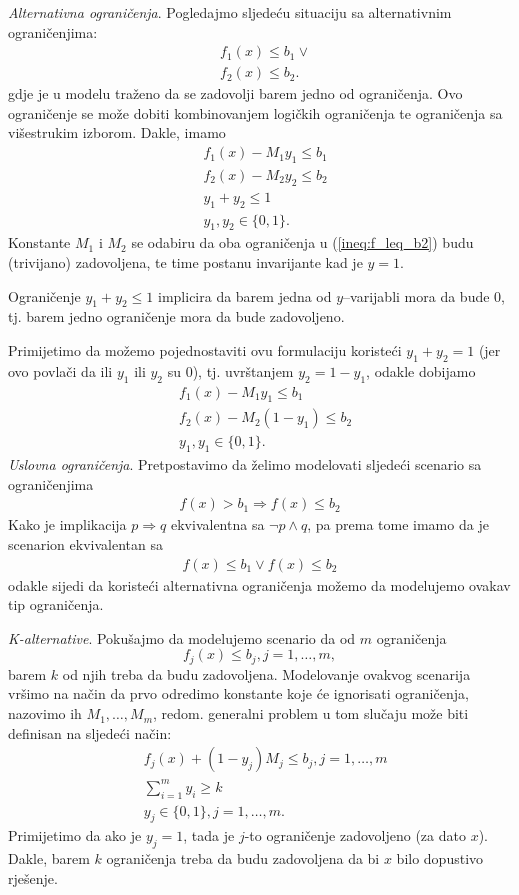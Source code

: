 \documentclass[a4paper, utf8, 11pt, colorlinks]{article}
\begin{document}
\emph{Alternativna ograničenja}. Pogledajmo sljedeću situaciju sa alternativnim ograničenjima:
\begin{align}
     &f_1(x) \leq b_1 \vee \nonumber\\
     &f_2(x) \leq b_2.\label{ineq:f_leq_b2}
\end{align}
gdje je u modelu traženo da se zadovolji barem jedno od ograničenja. 
Ovo ograničenje se može dobiti kombinovanjem logičkih ograničenja te ograničenja sa višestrukim izborom. Dakle, imamo 
\begin{align*}
      &f_1(x) - M_1 y_1  \leq b_1 \\
      &f_2(x) - M_2 y_2  \leq b_2 \\
      & y_1 + y_2 \leq 1 \\
      & y_1, y_2 \in \{0, 1\}.
\end{align*}
Konstante $M_1$ i $M_2$ se odabiru da oba ograničenja u (\ref{ineq:f_leq_b2})  budu (trivijano) zadovoljena, te time postanu invarijante kad je $y=1$.

Ograničenje $y_1 + y_2 \leq 1$ implicira da barem jedna od $y$--varijabli mora da bude 0, tj. barem jedno ograničenje mora da bude zadovoljeno. 

Primijetimo da možemo  pojednostaviti ovu formulaciju koristeći $y_1 + y_2 = 1$ (jer ovo povlači da ili $y_1$ ili $y_2$ su 0), tj. uvrštanjem $y_2 =  1-y_1$, odakle dobijamo 
\begin{align*}
      & f_1(x) - M_1 y_1       \leq b_1 \\
      & f_2(x) - M_2 (1-y_1)   \leq b_2  \\
      & y_1, y_1 \in \{0,1 \}.
\end{align*}
\emph{Uslovna ograničenja}. 
Pretpostavimo da želimo modelovati sljedeći scenario sa ograničenjima 
\begin{align*}
    f(x) > b_1 \Rightarrow f(x) \leq b_2 
\end{align*}
Kako je implikacija $p \Rightarrow q$ ekvivalentna sa $\neg p \wedge q$, pa prema tome imamo da je scenarion ekvivalentan sa
\begin{align*}
    f(x) \leq b_1 \vee f(x) \leq b_2 
\end{align*}
odakle sijedi da koristeći alternativna ograničenja možemo da modelujemo ovakav tip ograničenja.

\emph{K-alternative}. Pokušajmo da modelujemo scenario da od $m$ ograničenja
$$f_j(x) \leq  b_j, j=1,\ldots,m,$$
barem $k$ od njih treba da budu zadovoljena. Modelovanje ovakvog scenarija vršimo na način da prvo odredimo konstante koje će ignorisati ograničenja, nazovimo ih $M_1, \ldots, M_m$, redom. generalni problem u tom slučaju može biti definisan na sljedeći način:
\begin{align}
     &f_j(x) + (1-y_j) M_j \leq b_j, j=1,\ldots,m\\
     & \sum_{i=1}^m y_i \geq k \\
     & y_j \in \{0,1\}, j=1,\ldots,m.
\end{align}
Primijetimo da ako je $y_j = 1$, tada je $j$-to ograničenje zadovoljeno (za dato $x$). Dakle, barem $k$ ograničenja treba da budu zadovoljena da bi $x$ bilo dopustivo rješenje. 
\end{document}
